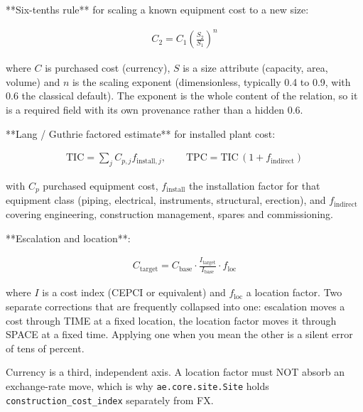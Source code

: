 \documentclass[10pt,a4paper,twoside]{report}
\begin{document}
**Six-tenths rule** for scaling a known equipment cost to a new size:

\begin{equation*}
\begin{gathered}
C_2 = C_1 \left(\frac{S_2}{S_1}\right)^{n}
\end{gathered}
\end{equation*}

where $C$ is purchased cost (currency), $S$ is a size attribute (capacity, area, volume) and $n$ is the scaling exponent (dimensionless, typically 0.4 to 0.9, with 0.6 the classical default). The exponent is the whole content of the relation, so it is a required field with its own provenance rather than a hidden 0.6.

**Lang / Guthrie factored estimate** for installed plant cost:

\begin{equation*}
\begin{gathered}
\mathrm{TIC} = \sum_j C_{p,j} f_{\mathrm{install},j}, \qquad \mathrm{TPC} = \mathrm{TIC}\,(1 + f_{\mathrm{indirect}})
\end{gathered}
\end{equation*}

with $C_p$ purchased equipment cost, $f_{\mathrm{install}}$ the installation factor for that equipment class (piping, electrical, instruments, structural, erection), and $f_{\mathrm{indirect}}$ covering engineering, construction management, spares and commissioning.

**Escalation and location**:

\begin{equation*}
\begin{gathered}
C_{\mathrm{target}} = C_{\mathrm{base}} \cdot \frac{I_{\mathrm{target}}}{I_{\mathrm{base}}} \cdot f_{\mathrm{loc}}
\end{gathered}
\end{equation*}

where $I$ is a cost index (CEPCI or equivalent) and $f_{\mathrm{loc}}$ a location factor. Two separate corrections that are frequently collapsed into one: escalation moves a cost through TIME at a fixed location, the location factor moves it through SPACE at a fixed time. Applying one when you mean the other is a silent error of tens of percent.

Currency is a third, independent axis. A location factor must NOT absorb an exchange-rate move, which is why \texttt{ae.core.site.Site} holds \texttt{construction\_cost\_index} separately from FX.
\end{document}
